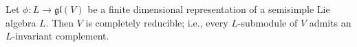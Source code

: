 Let $\phi: L \rightarrow \mathfrak{gl}(V)$ be a finite dimensional representation of a semisimple Lie algebra $L$. Then $V$ is completely reducible; i.e., every $L$-submodule of $V$ admits an $L$-invariant complement.
